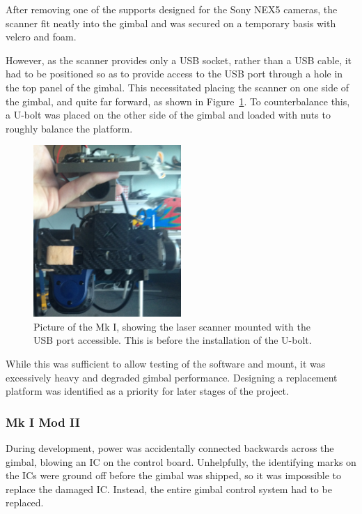 \documentclass[12pt,oneside,a4paper]{book}
\begin{document}
After removing one of the supports designed for the Sony NEX5 cameras,
the scanner fit neatly into the gimbal and was secured on a temporary
basis with velcro and foam.

However, as the scanner provides only a USB socket, rather than a USB
cable, it had to be positioned so as to provide access to the USB port
through a hole in the top panel of the gimbal. This necessitated
placing the scanner on one side of the gimbal, and quite far forward,
as shown in Figure~\ref{fig:mk1-mount}. To counterbalance this, a
U-bolt was placed on the other side of the gimbal and loaded with nuts
to roughly balance the platform.

\begin{figure}[h!]
  \centering
  \includegraphics[width=0.5\textwidth]{figs/mk1-mount}
  \caption{Picture of the Mk I, showing the laser scanner mounted with the USB port accessible. This is before the installation of the U-bolt.}
  \label{fig:mk1-mount}
\end{figure}

While this was sufficient to allow testing of the software and mount,
it was excessively heavy and degraded gimbal performance. Designing a
replacement platform was identified as a priority for later stages of the project.

\subsubsection{Mk I Mod II}
\label{sec:mk-ib}

During development, power was accidentally connected backwards across
the gimbal, blowing an IC on the control board. Unhelpfully, the
identifying marks on the ICs were ground off before the gimbal was
shipped, so it was impossible to replace the damaged IC. Instead, the
entire gimbal control system had to be replaced.
\end{document}
